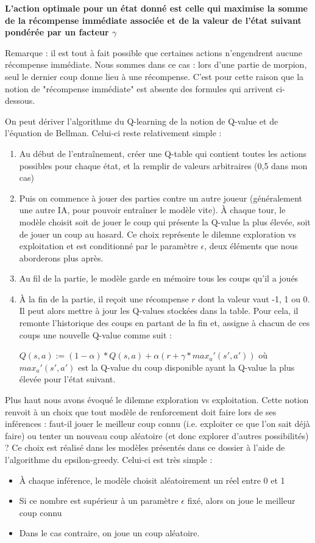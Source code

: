 \documentclass[french]{article}
\begin{document}
    {\centering \textbf{L'action optimale pour un état donné est celle qui maximise la somme de la récompense immédiate associée et de la valeur de l'état suivant pondérée par un facteur $\gamma$}}
    

    Remarque : il est tout à fait possible que certaines actions n'engendrent aucune récompense immédiate. Nous sommes dans ce cas : lors d'une partie de morpion, seul le dernier coup donne lieu à une récompense. C'est pour cette raison que la notion de "récompense immédiate" est absente des formules qui arrivent ci-dessous.
    
    On peut dériver l'algorithme du Q-learning de la notion de Q-value et de l'équation de Bellman. Celui-ci reste relativement simple :
    \begin{enumerate}
        \item Au début de l'entraînement, créer une Q-table qui contient toutes les actions possibles pour chaque état, et la remplir de valeurs arbitraires (0,5 dans mon cas)
        \item Puis on commence à jouer des parties contre un autre joueur (généralement une autre IA, pour pouvoir entraîner le modèle vite). À chaque tour, le modèle choisit soit de jouer le coup qui présente la Q-value la plus élevée, soit de jouer un coup au hasard. Ce choix représente le dilemne exploration vs exploitation et est conditionné par le paramètre $\epsilon$, deux éléments que nous aborderons plus après. 
        \item Au fil de la partie, le modèle garde en mémoire tous les coups qu'il a joués
        \item À la fin de la partie, il reçoit une récompense $r$ dont la valeur vaut -1, 1 ou 0. Il peut alors mettre à jour les Q-values stockées dans la table. Pour cela, il remonte l'historique des coups en partant de la fin et, assigne à chacun de ces coups une nouvelle Q-value comme suit :

        {\centering $Q(s,a) := (1-\alpha)*Q(s,a) + \alpha(r + \gamma * max_a'(s',a')) $}
        où $max_a'(s',a')$ est la Q-value du coup disponible ayant la Q-value la plus élevée pour l'état suivant.
        
    \end{enumerate}

    Plus haut nous avons évoqué le dilemne exploration vs exploitation. Cette notion renvoit à un choix que tout modèle de renforcement doit faire lors de ses inférences : faut-il jouer le meilleur coup connu (i.e. exploiter ce que l'on sait déjà faire) ou tenter un nouveau coup aléatoire (et donc explorer d'autres possibilités) ? Ce choix est réalisé dans les modèles présentés dans ce dossier à l'aide de l'algorithme du epsilon-greedy. Celui-ci est très simple :
    \begin{itemize}
        \item À chaque inférence, le modèle choisit aléatoirement un réel entre 0 et 1
        \item Si ce nombre est supérieur à un paramètre $\epsilon$ fixé, alors on joue le meilleur coup connu
        \item Dans le cas contraire, on joue un coup aléatoire.
    \end{itemize}
\end{document}
